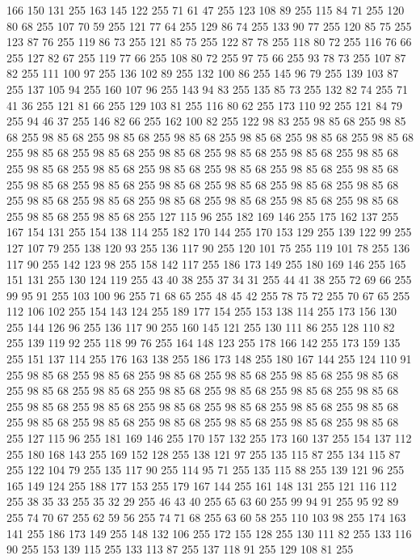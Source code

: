 166 150 131 255 163 145 122 255 71 61 47 255 123 108 89 255 115 84 71 255 120 80 68 255 107 70 59 255 121 77 64 255 129 86 74 255 133 90 77 255 120 85 75 255 123 87 76 255 119 86 73 255 121 85 75 255 122 87 78 255 118 80 72 255 116 76 66 255 127 82 67 255 119 77 66 255 108 80 72 255 97 75 66 255 93 78 73 255 107 87 82 255 111 100 97 255 136 102 89 255 132 100 86 255 145 96 79 255 139 103 87 255 137 105 94 255 160 107 96 255 143 94 83 255 135 85 73 255 132 82 74 255 71 41 36 255 121 81 66 255 129 103 81 255 116 80 62 255 173 110 92 255 121 84 79 255 94 46 37 255 146 82 66 255 162 100 82 255 122 98 83 255 98 85 68 255 98 85 68 255 98 85 68 255 98 85 68 255 98 85 68 255 98 85 68 255 98 85 68 255 98 85 68 255 98 85 68 255 98 85 68 255 98 85 68 255 98 85 68 255 98 85 68 255 98 85 68 255 98 85 68 255 98 85 68 255 98 85 68 255 98 85 68 255 98 85 68 255 98 85 68 255 98 85 68 255
98 85 68 255 98 85 68 255 98 85 68 255 98 85 68 255 98 85 68 255 98 85 68 255 98 85 68 255 98 85 68 255 98 85 68 255 98 85 68 255 98 85 68 255 98 85 68 255 98 85 68 255 127 115 96 255 182 169 146 255 175 162 137 255 167 154 131 255 154 138 114 255 182 170 144 255 170 153 129 255 139 122 99 255 127 107 79 255 138 120 93 255 136 117 90 255 120 101 75 255 119 101 78 255 136 117 90 255 142 123 98 255 158 142 117 255 186 173 149 255 180 169 146 255 165 151 131 255 130 124 119 255 43 40 38 255 37 34 31 255 44 41 38 255 72 69 66 255 99 95 91 255 103 100 96 255 71 68 65 255 48 45 42 255 78 75 72 255 70 67 65 255 112 106 102 255 154 143 124 255 189 177 154 255 153 138 114 255 173 156 130 255 144 126 96 255 136 117 90 255 160 145 121 255 130 111 86 255 128 110 82 255 139 119 92 255 118 99 76 255 164 148 123 255 178 166 142 255 173 159 135 255 151 137 114 255 176 163 138 255 186 173 148 255 180 167 144 255 124 110 91 255 98 85 68 255
98 85 68 255 98 85 68 255 98 85 68 255 98 85 68 255 98 85 68 255 98 85 68 255 98 85 68 255 98 85 68 255 98 85 68 255 98 85 68 255 98 85 68 255 98 85 68 255 98 85 68 255 98 85 68 255 98 85 68 255 98 85 68 255 98 85 68 255 98 85 68 255 98 85 68 255 98 85 68 255 98 85 68 255 98 85 68 255 98 85 68 255 127 115 96 255 181 169 146 255 170 157 132 255 173 160 137 255 154 137 112 255 180 168 143 255 169 152 128 255 138 121 97 255 135 115 87 255 134 115 87 255 122 104 79 255 135 117 90 255 114 95 71 255 135 115 88 255 139 121 96 255 165 149 124 255 188 177 153 255 179 167 144 255 161 148 131 255 121 116 112 255 38 35 33 255 35 32 29 255 46 43 40 255 65 63 60 255 99 94 91 255 95 92 89 255 74 70 67 255 62 59 56 255 74 71 68 255 63 60 58 255 110 103 98 255 174 163 141 255 186 173 149 255 148 132 106 255 172 155 128 255 130 111 82 255 133 116 90 255 153 139 115 255 133 113 87 255 137 118 91 255 129 108 81 255
